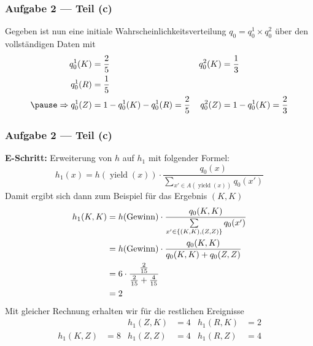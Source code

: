 \documentclass{beamer}
\DeclareMathOperator{\yield}{yield}
\DeclareMathOperator{\win}{Gewinn}
\begin{document}
\begin{frame} \frametitle{Aufgabe 2 --- Teil (c)}
	\justifying \footnotesize
	Gegeben ist nun eine initiale Wahrscheinlichkeitsverteilung $q_0 = q_0^1 \times q_0^2$ über den vollständigen Daten mit
	\begin{align*}
	q_0^1(K) &= \frac{2}{5} & q_0^2(K) &= \frac{1}{3} \\
	q_0^1(R) &= \frac{1}{5} \\ \pause
	\Rightarrow
	q_0^1(Z) &= 1 - q_0^1(K) - q_0^1(R) = \frac{2}{5} 
	&
	q_0^2(Z) &= 1 - q_0^1(K) = \frac{2}{3}
	\end{align*}
	
\end{frame}

\begin{frame} \frametitle{Aufgabe 2 --- Teil (c)}
	\justifying \footnotesize
	\textbf{E-Schritt:} Erweiterung von $h$ auf $h_1$ mit folgender Formel:
	\begin{equation*}
		h_1(x) = h(\yield(x)) \cdot \frac{q_0(x)}{\sum\limits_{x' \in A(\yield(x))} q_0(x')}
	\end{equation*}
	\pause
	Damit ergibt sich dann zum Beispiel für das Ergebnis $(K,K)$
	\begin{align*}
		h_1(K,K) &= h(\win) \cdot \frac{q_0(K,K)}{\sum\limits_{x' \in \menge{(K,K),(Z,Z)}} q_0(x')} \\
		&= h(\win) \cdot \frac{q_0(K,K)}{q_0(K,K) + q_0(Z,Z)} \\
		&= 6 \cdot \frac{\frac{2}{15}}{\frac{2}{15} + \frac{4}{15}} \\
		&= 2
	\end{align*}
	\pause
	Mit gleicher Rechnung erhalten wir für die restlichen Ereignisse
	\begin{align*}
		 && h_1(Z,K) &= 4 & h_1(R,K) &= 2 \\
		h_1(K,Z) &= 8 & h_1(Z,Z) &= 4 & h_1(R,Z) &= 4
	\end{align*}
\end{frame}
\end{document}
